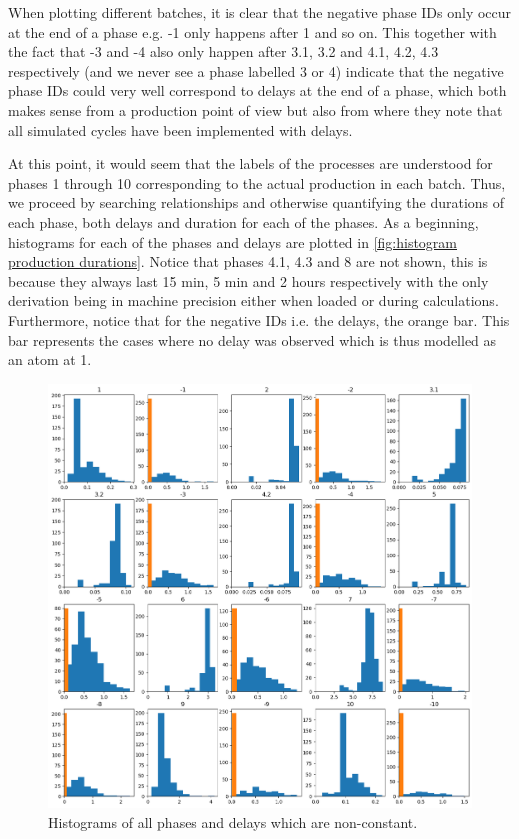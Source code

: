 \documentclass[../Thesis.tex]{subfiles}
\begin{document}
When plotting different batches, it is clear that the negative phase IDs only occur at the end of a phase e.g. -1 only happens after 1 and so on. This together with the fact that -3 and -4 also only happen after 3.1, 3.2 and 4.1, 4.2, 4.3 respectively (and we never see a phase labelled 3 or 4) indicate that the negative phase IDs could very well correspond to delays at the end of a phase, which both makes sense from a production point of view but also from \cite{benchmark-model-to-generate-batch-process-data} where they note that all simulated cycles have been implemented with delays.

At this point, it would seem that the labels of the processes are understood for phases 1 through 10 corresponding to the actual production in each batch. Thus, we proceed by searching relationships and otherwise quantifying the durations of each phase, both delays and duration for each of the phases. As a beginning, histograms for each of the phases and delays are plotted in \autoref{fig:histogram production durations}. Notice that phases 4.1, 4.3 and 8 are not shown, this is because they always last 15 min, 5 min and 2 hours respectively with the only derivation being in machine precision either when loaded or during calculations. Furthermore, notice that for the negative IDs i.e. the delays, the orange bar. This bar represents the cases where no delay was observed which is thus modelled as an atom at 1.

\begin{figure}[H]
    \centering
    \includegraphics[width=\linewidth]{figures/Multiple cycles data/Adding of solids/hisstograms w atoms.png}
    \caption{Histograms of all phases and delays which are non-constant.}
    \label{fig:histogram production durations}
\end{figure}
\end{document}
